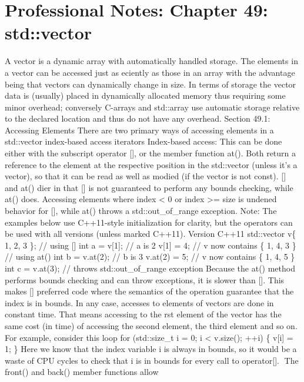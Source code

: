 \hypertarget{professional-notes-chapter-49-stdvector-1}{%
\section{Professional Notes: Chapter 49:
std::vector}\label{professional-notes-chapter-49-stdvector-1}}

A vector is a dynamic array with automatically handled storage. The
elements in a vector can be accessed just as eciently as those in an
array with the advantage being that vectors can dynamically change in
size. In terms of storage the vector data is (usually) placed in
dynamically allocated memory thus requiring some minor overhead;
conversely C-arrays and std::array use automatic storage relative to the
declared location and thus do not have any overhead. Section 49.1:
Accessing Elements There are two primary ways of accessing elements in a
std::vector index-based access iterators Index-based access: This can be
done either with the subscript operator {[}{]}, or the member function
at(). Both return a reference to the element at the respective position
in the std::vector (unless it's a vector), so that it can be read as
well as modied (if the vector is not const). {[}{]} and at() dier in
that {[}{]} is not guaranteed to perform any bounds checking, while at()
does. Accessing elements where index \textless{} 0 or index
\textgreater= size is undened behavior for {[}{]}, while at() throws a
std::out\_of\_range exception. Note: The examples below use C++11-style
initialization for clarity, but the operators can be used with all
versions (unless marked C++11). Version C++11 std::vector v\{ 1, 2, 3
\}; // using {[}{]} int a = v{[}1{]}; // a is 2 v{[}1{]} = 4; // v now
contains \{ 1, 4, 3 \} // using at() int b = v.at(2); // b is 3 v.at(2)
= 5; // v now contains \{ 1, 4, 5 \} int c = v.at(3); // throws
std::out\_of\_range exception Because the at() method performs bounds
checking and can throw exceptions, it is slower than {[}{]}. This makes
{[}{]} preferred code where the semantics of the operation guarantee
that the index is in bounds. In any case, accesses to elements of
vectors are done in constant time. That means accessing to the rst
element of the vector has the same cost (in time) of accessing the
second element, the third element and so on. For example, consider this
loop for (std::size\_t i = 0; i \textless{} v.size(); ++i) \{ v{[}i{]} =
1; \} Here we know that the index variable i is always in bounds, so it
would be a waste of CPU cycles to check that i is in bounds for every
call to operator{[}{]}. The front() and back() member functions allow
